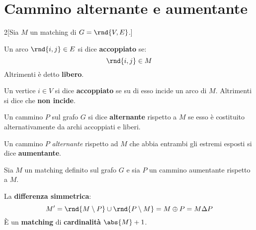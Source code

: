 \documentclass[\main/main.tex]{subfiles}
\begin{document}
\section{Cammino alternante e aumentante}
\begin{multicols}{2}[Sia \(M\) un matching di \(G = \rnd{V, E}\).]
	\begin{definition}
		Un arco \(\rnd{i,j} \in E\) si dice \textbf{accoppiato} se:
		\[
			\rnd{i,j} \in M
		\]
		Altrimenti è detto \textbf{libero}.
	\end{definition}
	\begin{definition}
		Un vertice \(i \in V\) si dice \textbf{accoppiato} se su di esso incide un arco di \(M\). Altrimenti si dice che \textbf{non incide}.
	\end{definition}
	\begin{definition}
		Un cammino \(P\) sul grafo \(G\) si dice \textbf{alternante} rispetto a \(M\) se esso è costituito alternativamente da archi accoppiati e liberi.
	\end{definition}
	\begin{definition}
		Un cammino \(P\) \textit{alternante} rispetto ad \(M\) che abbia entrambi gli estremi esposti si dice \textbf{aumentante}.
	\end{definition}
\end{multicols}

\begin{theorem}
	Sia \(M\) un matching definito sul grafo \(G\) e sia \(P\) un cammino aumentante rispetto a \(M\).

	La \textbf{differenza simmetrica}:
	\[
		M' = \rnd{M\setminus P} \cup \rnd{P\setminus M} = M \oplus P = M \Delta P
	\]
	È un \textbf{matching} di \textbf{cardinalità} \(\abs{M} + 1\).
\end{theorem}
\end{document}
